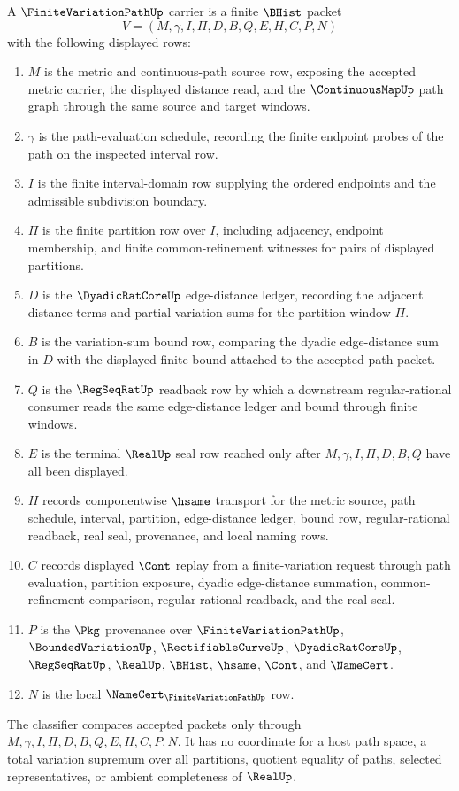 \begin{definition}
\label{def:finite-variation-path-carrier}
A $\FiniteVariationPathUp$ carrier is a finite $\BHist$ packet
$$
V=(M,\gamma,I,\Pi,D,B,Q,E,H,C,P,N)
$$
with the following displayed rows:
\begin{enumerate}
\item $M$ is the metric and continuous-path source row, exposing the accepted metric carrier, the displayed distance read, and the $\ContinuousMapUp$ path graph through the same source and target windows.
\item $\gamma$ is the path-evaluation schedule, recording the finite endpoint probes of the path on the inspected interval row.
\item $I$ is the finite interval-domain row supplying the ordered endpoints and the admissible subdivision boundary.
\item $\Pi$ is the finite partition row over $I$, including adjacency, endpoint membership, and finite common-refinement witnesses for pairs of displayed partitions.
\item $D$ is the $\DyadicRatCoreUp$ edge-distance ledger, recording the adjacent distance terms and partial variation sums for the partition window $\Pi$.
\item $B$ is the variation-sum bound row, comparing the dyadic edge-distance sum in $D$ with the displayed finite bound attached to the accepted path packet.
\item $Q$ is the $\RegSeqRatUp$ readback row by which a downstream regular-rational consumer reads the same edge-distance ledger and bound through finite windows.
\item $E$ is the terminal $\RealUp$ seal row reached only after $M,\gamma,I,\Pi,D,B,Q$ have all been displayed.
\item $H$ records componentwise $\hsame$ transport for the metric source, path schedule, interval, partition, edge-distance ledger, bound row, regular-rational readback, real seal, provenance, and local naming rows.
\item $C$ records displayed $\Cont$ replay from a finite-variation request through path evaluation, partition exposure, dyadic edge-distance summation, common-refinement comparison, regular-rational readback, and the real seal.
\item $P$ is the $\Pkg$ provenance over $\FiniteVariationPathUp$, $\BoundedVariationUp$, $\RectifiableCurveUp$, $\DyadicRatCoreUp$, $\RegSeqRatUp$, $\RealUp$, $\BHist$, $\hsame$, $\Cont$, and $\NameCert$.
\item $N$ is the local $\NameCert_{\FiniteVariationPathUp}$ row.
\end{enumerate}
The classifier compares accepted packets only through $M,\gamma,I,\Pi,D,B,Q,E,H,C,P,N$. It has no coordinate for a host path space, a total variation supremum over all partitions, quotient equality of paths, selected representatives, or ambient completeness of $\RealUp$.
\end{definition}

